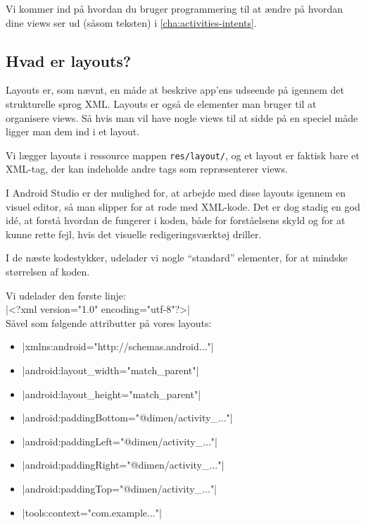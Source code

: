 Vi kommer ind på hvordan du bruger programmering til at ændre på hvordan dine views ser ud (såsom teksten) i \autoref{cha:activities-intents}.

\subsection{Hvad er layouts?}
Layouts er, som nævnt, en måde at beskrive app'ens udseende på igennem det strukturelle sprog XML. Layouts er også de elementer man bruger til at organisere views. Så hvis man vil have nogle views til at sidde på en speciel måde ligger man dem ind i et layout.

Vi lægger layouts i ressource mappen \texttt{res/layout/}, og et layout er 
faktisk bare et XML-tag, der kan indeholde andre tags som repræsenterer views.

I Android Studio er der mulighed for, at arbejde med disse layouts igennem en 
visuel editor, så man slipper for at rode med XML-kode. Det er dog stadig en 
god idé, at forstå hvordan de fungerer i koden, både for forståelsens skyld og 
for at kunne rette fejl, hvis det visuelle redigeringsværktøj driller.

\begin{remark}
	I de næste kodestykker, udelader vi nogle ``standard'' elementer, for at mindske størrelsen af koden.
	
	Vi udelader den første linje: \\
	\XmlInline|<?xml version="1.0" encoding="utf-8"?>|\\
	Såvel som følgende attributter på vores layouts:
	\begin{itemize}
		\item \XmlInline|xmlns:android="http://schemas.android..."|
		\item \XmlInline|android:layout_width="match_parent"|
		\item \XmlInline|android:layout_height="match_parent"|
		\item \XmlInline|android:paddingBottom="@dimen/activity_..."|
		\item \XmlInline|android:paddingLeft="@dimen/activity_..."|
		\item \XmlInline|android:paddingRight="@dimen/activity_..."|
		\item \XmlInline|android:paddingTop="@dimen/activity_..."|
		\item \XmlInline|tools:context="com.example..."|
	\end{itemize}
\end{remark}

